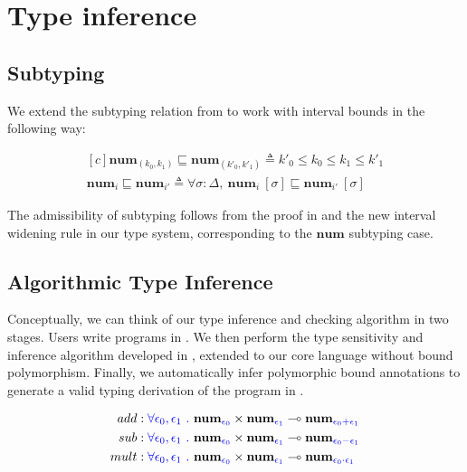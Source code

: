 \section{Type inference}

\subsection{Subtyping}
We extend the subtyping relation from \cite{NumFuzz} to work with interval
bounds in the following way:

$$
\begin{aligned}[c]
\textbf{num}_{(k_0, k_1)} \sqsubseteq \textbf{num}_{(k'_0, k'_1)} \triangleq 
k'_0 \leq k_0 \leq k_1 \leq k'_1 \\
\textbf{num}_{i} \sqsubseteq \textbf{num}_{i'} \triangleq 
\forall \sigma : \Delta, \
\textbf{num}_{i}~[\sigma] \sqsubseteq \textbf{num}_{i'}~[\sigma]
\end{aligned}
$$

\begin{theorem}
  The admissibility of subtyping follows from the proof in \cite{NumFuzz} and the
new interval widening rule in our type system, corresponding to the
$\textbf{num}$ subtyping case.
\end{theorem}

\subsection{Algorithmic Type Inference}

Conceptually, we can think of our type inference and checking algorithm in two
stages. Users write programs in \Lang. We then perform the type sensitivity and
inference algorithm developed in \cite{NumFuzz}, extended to our core language
without bound polymorphism. Finally, we automatically infer polymorphic bound
annotations to generate a valid typing derivation of the program in \bnd{\Lang}.

\begin{equation}
  \begin{aligned}[c]
    add &: \textcolor{blue}{\forall \epsilon_0, \epsilon_1 \ .} \
    \textbf{num}_{\textcolor{blue}{\epsilon_0}} \times \textbf{num}_{\textcolor{blue}{\epsilon_1}}
    \multimap \textbf{num}_{\textcolor{blue}{\epsilon_0 + \epsilon_1}} \\
    sub &: \textcolor{blue}{\forall \epsilon_0, \epsilon_1 \ .} \
    \textbf{num}_{\textcolor{blue}{\epsilon_0}} \times \textbf{num}_{\textcolor{blue}{\epsilon_1}}
    \multimap \textbf{num}_{\textcolor{blue}{\epsilon_0 - \epsilon_1}} \\
    mult &: \textcolor{blue}{\forall \epsilon_0, \epsilon_1 \ .} \
    \textbf{num}_{\textcolor{blue}{\epsilon_0}} \times \textbf{num}_{\textcolor{blue}{\epsilon_1}}
    \multimap \textbf{num}_{\textcolor{blue}{\epsilon_0 \cdot \epsilon_1}} \\
  \end{aligned}
\end{equation}

